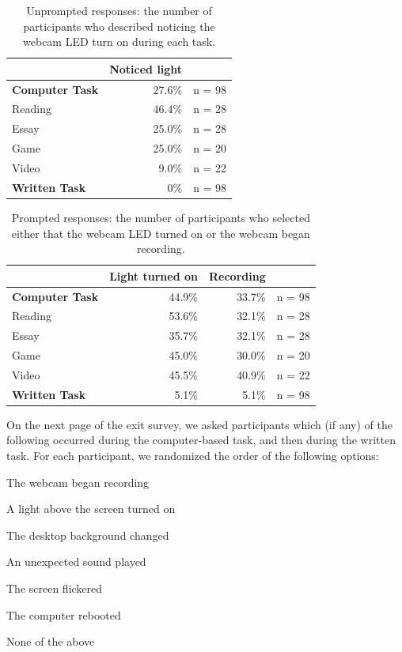 \documentclass{sigchi}
\newenvironment{packed_item}{
\begin{itemize}
  \setlength{\itemsep}{1pt}
  \setlength{\parskip}{0pt}
  \setlength{\parsep}{0pt}
}{\end{itemize}}
\begin{document}
\newcommand*{\MyIndent}{\hspace*{0.5cm}}%
\begin {table}
\centering
\begin{tabular}{lrl}
             & Noticed light & \\
\hline
\textbf{Computer Task} & 27.6\% & n = 98 \\
\MyIndent Reading & 46.4\% & n = 28 \\
\MyIndent Essay & 25.0\% &  n = 28 \\
\MyIndent Game & 25.0\% & n = 20\\
\MyIndent Video & 9.0\% & n = 22 \\
\textbf{Written Task} & 0\% & n = 98 \\
\hline
\end{tabular}
\caption {Unprompted responses: the number of participants who described noticing the webcam LED turn on during each task.}
\label{unprompted}
\end {table}

\begin {table}
\centering
\begin{tabular}{lrrl}
             & Light turned on & Recording \\
\hline
\textbf{Computer Task} & 44.9\% & 33.7\% & n = 98 \\
\MyIndent Reading & 53.6\% & 32.1\% & n = 28 \\
\MyIndent Essay & 35.7\% & 32.1\% & n = 28 \\
\MyIndent Game & 45.0\% & 30.0\% & n = 20 \\
\MyIndent Video & 45.5\% & 40.9\% & n = 22 \\
\textbf{Written Task} & 5.1\% & 5.1\% & n = 98 \\
\hline
\end{tabular}
\caption {Prompted responses: the number of participants who selected either that the webcam LED turned on or the webcam began recording.}
\label{prompted}
\end {table}

On the next page of the exit survey, we asked participants which (if any) of the following occurred during the computer-based task, and then during the written task. For each participant, we randomized the order of the following options:
\begin{packed_item}
\item The webcam began recording
\item A light above the screen turned on
\item The desktop background changed
\item An unexpected sound played
\item The screen flickered
\item The computer rebooted
\item None of the above
\end{packed_item}
\end{document}
